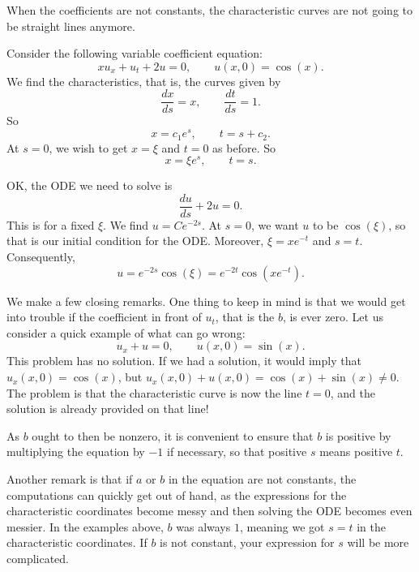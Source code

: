 When the coefficients are not constants, the characteristic curves
are not going to be straight lines anymore.

\begin{example}
Consider the following variable coefficient equation:
\begin{equation*}
x u_x + u_t + 2 u = 0, \qquad u(x,0) = \cos(x) . %
\end{equation*}
We find the characteristics, that is, the curves given by
\begin{equation*}
\frac{dx}{ds} = x, \qquad \frac{dt}{ds} = 1 .
\end{equation*}
So
\begin{equation*}
x = c_1 e^{s} , \qquad t = s+ c_2 .
\end{equation*}
At $s=0$, we wish to get $x=\xi$ and $t=0$ as before.  So
\begin{equation*}
x = \xi e^s, \qquad t = s .
\end{equation*}

OK\@, the ODE we need to solve is
\begin{equation*}
\frac{du}{ds} + 2 u = 0 .
\end{equation*}
This is for a fixed $\xi$.  We find $u = C e^{-2s}$.
At $s=0$, we want $u$ to be
$\cos(\xi)$, so that is our initial condition for the ODE.
Moreover, $\xi = xe^{-t}$ and $s=t$.
Consequently,
\begin{equation*}
u = e^{-2s} \cos(\xi)= e^{-2t} \cos(xe^{-t}) .
\end{equation*}
\end{example}


We make a few closing remarks.
One thing to keep in mind is that we would get into trouble if the
coefficient in front of $u_t$, that is the $b$, is ever zero.
Let us consider a quick example of what can go wrong:
\begin{equation*}
u_x + u = 0, \qquad u(x,0) = \sin(x).
\end{equation*}
This problem has no solution.  If we had a solution, it
would imply that $u_x(x,0) = \cos(x)$,
but $u_x(x,0) + u(x,0) = \cos(x) + \sin(x) \not= 0$.
The problem is that the characteristic curve is now the line $t=0$,
and the solution is already provided on that line!

As $b$ ought to then be nonzero,
it is convenient to ensure that $b$ is positive by multiplying
the equation by $-1$
if necessary, so that positive $s$ means positive $t$.

Another remark is that if $a$ or $b$ in the equation are not constants,
the computations can
quickly get out of hand, as the expressions for the characteristic
coordinates become messy and then solving the ODE becomes even messier.
In the examples above, $b$ was always $1$, meaning we got $s=t$ in the 
characteristic coordinates.  If $b$ is not constant, your expression for $s$
will be more complicated.


